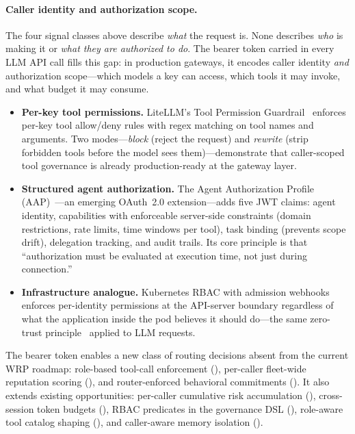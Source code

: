 \paragraph{Caller identity and authorization scope.}
The four signal classes above describe \emph{what} the request is.
None describes \emph{who} is making it or \emph{what they are
authorized to do}.  The bearer token carried in every LLM API call
fills this gap: in production gateways, it encodes caller identity
\emph{and} authorization scope---which models a key can access, which
tools it may invoke, and what budget it may consume.
\begin{itemize}[nosep]
  \item \textbf{Per-key tool permissions.}
        LiteLLM's Tool Permission Guardrail~\cite{litellm2026toolguard}
        enforces per-key tool allow/deny rules with regex matching on
        tool names and arguments.  Two modes---\emph{block} (reject the
        request) and \emph{rewrite} (strip forbidden tools before the
        model sees them)---demonstrate that caller-scoped tool governance
        is already production-ready at the gateway layer.
  \item \textbf{Structured agent authorization.}
        The Agent Authorization Profile
        (AAP)~\cite{aap2026}---an emerging OAuth~2.0 extension---adds
        five JWT claims: agent identity, capabilities with enforceable
        server-side constraints (domain restrictions, rate limits, time
        windows per tool), task binding (prevents scope drift), delegation
        tracking, and audit trails.  Its core principle is that
        ``authorization must be evaluated at execution time, not just
        during connection.''
  \item \textbf{Infrastructure analogue.}
        Kubernetes RBAC with admission webhooks enforces per-identity
        permissions at the API-server boundary regardless of what the
        application inside the pod believes it should do---the same
        zero-trust principle~\cite{nist800207} applied to LLM
        requests.
\end{itemize}
The bearer token enables a new class of routing decisions absent
from the current WRP roadmap: role-based tool-call enforcement
(), per-caller fleet-wide reputation
scoring (), and router-enforced
behavioral commitments ().  It
also extends existing opportunities: per-caller cumulative risk
accumulation (), cross-session token
budgets (), RBAC predicates in the
governance DSL (), role-aware tool catalog
shaping (), and caller-aware memory
isolation ().


